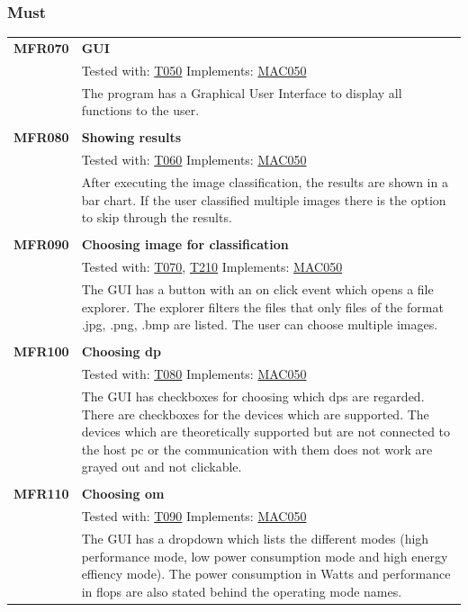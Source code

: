 \documentclass[parskip=full]{scrartcl}
\begin{document}
\subsubsection{Must}
\begin{tabular}{p{2cm}p{11.4cm}}
\textbf {MFR070} \hypertarget{MFR070}& \textbf{GUI} \\
& Tested with: \hyperlink{T050}{T050} Implements: \hyperlink{MAC050}{MAC050} \\
& The program has a Graphical User Interface to display all functions to the user. \\
& \\
\textbf {MFR080}\hypertarget{MFR080}  & \textbf{Showing results} \\
& Tested with: \hyperlink{T060}{T060} Implements: \hyperlink{MAC050}{MAC050} \\
& After executing the \gls{image classification}, the results are shown in a bar chart. If the user classified multiple images there is the option to skip through the results.\\
& \\
\textbf{MFR090} \hypertarget{MFR090}& \textbf{Choosing image for classification}\\
& Tested with: \hyperlink{T070}{T070}, \hyperlink{T210}{T210} Implements: \hyperlink{MAC050}{MAC050} \\
& The GUI has a button with an on click event which opens a file explorer. The explorer filters the files that only files of the format .jpg, .png, .bmp are listed. The user can choose multiple images.\\
& \\
\textbf{MFR100} \hypertarget{MFR100}& \textbf{Choosing \gls{dp}}\\
& Tested with: \hyperlink{T080}{T080} Implements: \hyperlink{MAC050}{MAC050} \\
& The GUI has checkboxes for choosing which \glspl{dp} are regarded. There are checkboxes for the devices which are supported. The devices which are theoretically supported but are not connected to the \gls{host pc} or the communication with them does not work are grayed out and not clickable. \\
& \\
\textbf{MFR110}\hypertarget{MFR110} & \textbf{Choosing \gls{om}}\\
& Tested with: \hyperlink{T090}{T090} Implements: \hyperlink{MAC050}{MAC050}  \\
& The GUI has a dropdown which lists the different modes (high \gls{performance} mode, low \gls{power consumption} mode and high energy effiency mode). The \gls{power consumption} in Watts and \gls{performance} in \gls{flops} are also stated behind the operating mode names.
\end{tabular}
\end{document}
